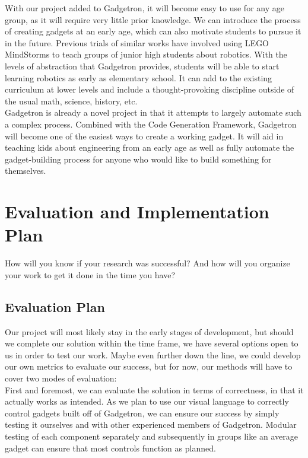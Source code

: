 \documentclass[12pt]{article}
\begin{document}
With our project added to Gadgetron, it will become easy to use for any age group, as it will require very little prior knowledge. We can introduce the process of creating gadgets at an early age, which can also motivate students to pursue it in the future. Previous trials of similar works have involved using LEGO MindStorms to teach groups of junior high students about robotics\cite{legomindstorms}. With the levels of abstraction that Gadgetron provides, students will be able to start learning robotics as early as elementary school. It can add to the existing curriculum at lower levels and include a thought-provoking discipline outside of the usual math, science, history, etc.\\[7pt]

Gadgetron is already a novel project in that it attempts to largely automate such a complex process. Combined with the Code Generation Framework, Gadgetron will become one of the easiest ways to create a working gadget. It will aid in teaching kids about engineering from an early age as well as fully automate the gadget-building process for anyone who would like to build something for themselves.


\section{Evaluation and Implementation Plan}
How will you know if your research was successful?  And how will you organize your work to get it done in the time you have?

\subsection{Evaluation Plan}
Our project will most likely stay in the early stages of development, but should we complete our solution within the time frame, we have several options open to us in order to test our work. Maybe even further down the line, we could develop our own metrics to evaluate our success, but for now, our methods will have to cover two modes of evaluation:\\[7pt]

First and foremost, we can evaluate the solution in terms of correctness, in that it actually works as intended. As we plan to use our visual language to correctly control gadgets built off of Gadgetron, we can ensure our success by simply testing it ourselves and with other experienced members of Gadgetron. Modular testing of each component separately and subsequently in groups like an average gadget can ensure that most controls function as planned.\\[7pt]
\end{document}
